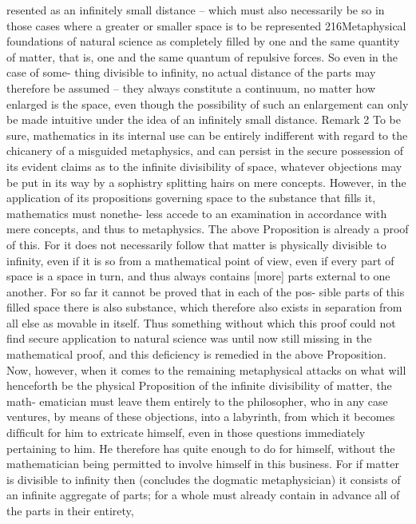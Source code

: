 resented as an inﬁnitely small distance – which must also necessarily be
so in those cases where a greater or smaller space is to be represented
216Metaphysical foundations of natural science
as completely ﬁlled by one and the same quantity of matter, that is, one
and the same quantum of repulsive forces. So even in the case of some-
thing divisible to inﬁnity, no actual distance of the parts may therefore be
assumed – they always constitute a continuum, no matter how enlarged
is the space, even though the possibility of such an enlargement can only
be made intuitive under the idea of an inﬁnitely small distance.
Remark 2
To be sure, mathematics in its internal use can be entirely indifferent
with regard to the chicanery of a misguided metaphysics, and can persist
in the secure possession of its evident claims as to the inﬁnite divisibility
of space, whatever objections may be put in its way by a sophistry splitting
hairs on mere concepts. However, in the application of its propositions
governing space to the substance that ﬁlls it, mathematics must nonethe-
less accede to an examination in accordance with mere concepts, and thus
to metaphysics. The above Proposition is already a proof of this. For it
does not necessarily follow that matter is physically divisible to inﬁnity,
even if it is so from a mathematical point of view, even if every part of
space is a space in turn, and thus always contains [more] parts external
to one another. For so far it cannot be proved that in each of the pos-
sible parts of this ﬁlled space there is also substance, which therefore also
exists in separation from all else as movable in itself. Thus something
without which this proof could not ﬁnd secure application to natural
science was until now still missing in the mathematical proof, and this
deﬁciency is remedied in the above Proposition. Now, however, when
it comes to the remaining metaphysical attacks on what will henceforth
be the physical Proposition of the inﬁnite divisibility of matter, the math-
ematician must leave them entirely to the philosopher, who in any case
ventures, by means of these objections, into a labyrinth, from which it
becomes difﬁcult for him to extricate himself, even in those questions
immediately pertaining to him. He therefore has quite enough to do for
himself, without the mathematician being permitted to involve himself
in this business. For if matter is divisible to inﬁnity then (concludes the
dogmatic metaphysician) it consists of an inﬁnite aggregate of parts; for a
whole must already contain in advance all of the parts in their entirety,
